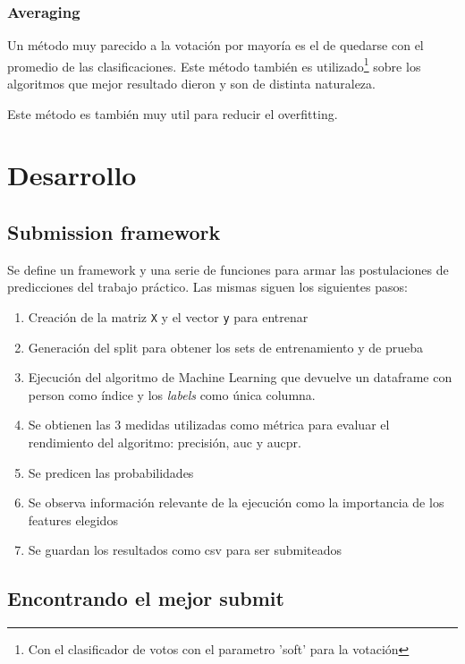 \documentclass[a4paper]{article}
\begin{document}
\subsubsection{Averaging}

Un método muy parecido a la votación por mayoría es el de quedarse con el promedio de las clasificaciones. Este método también es utilizado\footnote{Con el clasificador de votos con el parametro 'soft' para la votación} sobre los algoritmos que mejor resultado dieron y son de distinta naturaleza. 

Este método es también muy util para reducir el overfitting.

\section{Desarrollo}

\subsection{Submission framework}

Se define un framework y una serie de funciones para armar las postulaciones de predicciones del trabajo práctico. Las mismas siguen los siguientes pasos:

\begin{enumerate}
	\item Creación de la matriz \texttt{X} y el vector \texttt{y} para entrenar
	\item Generación del split para obtener los sets de entrenamiento y de prueba
	\item Ejecución del algoritmo de Machine Learning que devuelve un dataframe con person como índice y los \textit{labels} como única columna.
	\item Se obtienen las 3 medidas utilizadas como métrica para evaluar el rendimiento del algoritmo: precisión, auc y aucpr.
	\item Se predicen las probabilidades 
	\item Se observa información relevante de la ejecución como la importancia de los features elegidos
	\item Se guardan los resultados como csv para ser submiteados
\end{enumerate}

\subsection{Encontrando el mejor submit}
\end{document}
